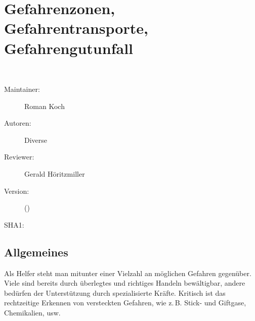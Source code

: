 \def\ChapterCode{GEF}
\chapter
[\CO{[GEF]} Gefahrenzonen, Gefahrentransporte, Gefahrengutunfall]
{Gefahrenzonen, \\Gefahrentransporte,
\\Gefahrengutunfall}
\label{topic:gefahrengutunfall}

\ChapterIntro
{%
~~~
}
{%
\begin{description}
  \item[Maintainer:] Roman Koch
  \item[Autoren:] Diverse
  \item[Reviewer:] Gerald Höritzmiller
  \item[Version:] {\DocVersion} ({\DocVersionInfo})
  \item[SHA1:] {\DocGitCommit}
\end{description}

{\TxTeilkapitelAASS}
}




\clearpage

\section{Allgemeines}

Als Helfer steht man mitunter einer Vielzahl an möglichen
Gefahren gegenüber. Viele sind bereits durch überlegtes und
richtiges Handeln bewältigbar, andere bedürfen der
Unterstützung durch spezialisierte Kräfte. Kritisch ist das
rechtzeitige Erkennen von versteckten Gefahren, wie z.\,B.
Stick- und Giftgase, Chemikalien, usw.


